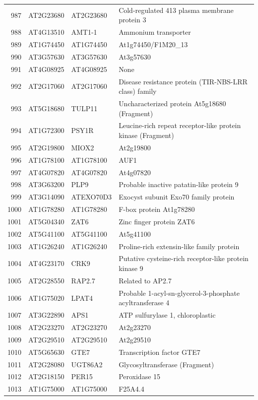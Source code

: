 \documentclass[11pt]{article}
\begin{document}
\begin{center}
\begin{tabular}{rlll}
987 & AT2G23680 & AT2G23680 & Cold-regulated 413 plasma membrane protein 3\\
988 & AT4G13510 & AMT1-1 & Ammonium transporter\\
989 & AT1G74450 & AT1G74450 & At1g74450/F1M20\_13\\
990 & AT3G57630 & AT3G57630 & At3g57630\\
991 & AT4G08925 & AT4G08925 & None\\
992 & AT2G17060 & AT2G17060 & Disease resistance protein (TIR-NBS-LRR class) family\\
993 & AT5G18680 & TULP11 & Uncharacterized protein At5g18680 (Fragment)\\
994 & AT1G72300 & PSY1R & Leucine-rich repeat receptor-like protein kinase (Fragment)\\
995 & AT2G19800 & MIOX2 & At2g19800\\
996 & AT1G78100 & AT1G78100 & AUF1\\
997 & AT4G07820 & AT4G07820 & At4g07820\\
998 & AT3G63200 & PLP9 & Probable inactive patatin-like protein 9\\
999 & AT3G14090 & ATEXO70D3 & Exocyst subunit Exo70 family protein\\
1000 & AT1G78280 & AT1G78280 & F-box protein At1g78280\\
1001 & AT5G04340 & ZAT6 & Zinc finger protein ZAT6\\
1002 & AT5G41100 & AT5G41100 & At5g41100\\
1003 & AT1G26240 & AT1G26240 & Proline-rich extensin-like family protein\\
1004 & AT4G23170 & CRK9 & Putative cysteine-rich receptor-like protein kinase 9\\
1005 & AT2G28550 & RAP2.7 & Related to AP2.7\\
1006 & AT1G75020 & LPAT4 & Probable 1-acyl-sn-glycerol-3-phosphate acyltransferase 4\\
1007 & AT3G22890 & APS1 & ATP sulfurylase 1, chloroplastic\\
1008 & AT2G23270 & AT2G23270 & At2g23270\\
1009 & AT2G29510 & AT2G29510 & At2g29510\\
1010 & AT5G65630 & GTE7 & Transcription factor GTE7\\
1011 & AT2G28080 & UGT86A2 & Glycosyltransferase (Fragment)\\
1012 & AT2G18150 & PER15 & Peroxidase 15\\
1013 & AT1G75000 & AT1G75000 & F25A4.4\\

\end{tabular}
\end{center}
\end{document}
